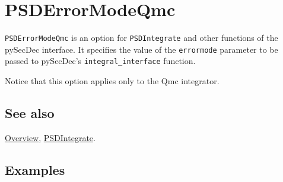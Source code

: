 \documentclass[../FeynHelpersManual.tex]{subfiles}
\begin{document}
\hypertarget{psderrormodeqmc}{
\section{PSDErrorModeQmc}\label{psderrormodeqmc}}

\texttt{PSDErrorModeQmc} is an option for \texttt{PSDIntegrate} and
other functions of the pySecDec interface. It specifies the value of the
\texttt{errormode} parameter to be passed to pySecDec's
\texttt{integral_interface} function.

Notice that this option applies only to the Qmc integrator.

\subsection{See also}

\hyperlink{toc}{Overview}, \hyperlink{psdintegrate}{PSDIntegrate}.

\subsection{Examples}
\end{document}
